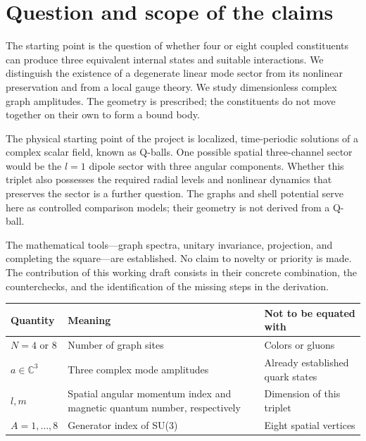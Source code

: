 \documentclass[a4paper,11pt]{article}
\newcommand{\C}{\mathbb C}
\newenvironment{drafttable}{\begin{center}\small\renewcommand{\arraystretch}{1.2}}{\end{center}}
\begin{document}
\section{Question and scope of the claims}\label{sec:scope}
The starting point is the question of whether four or eight coupled constituents can produce three equivalent internal states and suitable interactions. We distinguish the existence of a degenerate linear mode sector from its nonlinear preservation and from a local gauge theory. We study dimensionless complex graph amplitudes. The geometry is prescribed; the constituents do not move together on their own to form a bound body.

The physical starting point of the project is localized, time-periodic solutions of a complex scalar field, known as Q-balls. One possible spatial three-channel sector would be the $l=1$ dipole sector with three angular components. Whether this triplet also possesses the required radial levels and nonlinear dynamics that preserves the sector is a further question. The graphs and shell potential serve here as controlled comparison models; their geometry is not derived from a Q-ball.

The mathematical tools---graph spectra, unitary invariance, projection, and completing the square---are established. No claim to novelty or priority is made. The contribution of this working draft consists in their concrete combination, the counterchecks, and the identification of the missing steps in the derivation.

\begin{drafttable}
\begin{tabularx}{\linewidth}{@{}lXX@{}}
\toprule Quantity & Meaning & Not to be equated with\\\midrule
$N=4$ or $8$ & Number of graph sites & Colors or gluons\\
$a\in\C^3$ & Three complex mode amplitudes & Already established quark states\\
$l,m$ & Spatial angular momentum index and magnetic quantum number, respectively & Dimension of this triplet\\
$A=1,\ldots,8$ & Generator index of SU(3) & Eight spatial vertices\\\bottomrule
\end{tabularx}
\end{drafttable}
\end{document}
